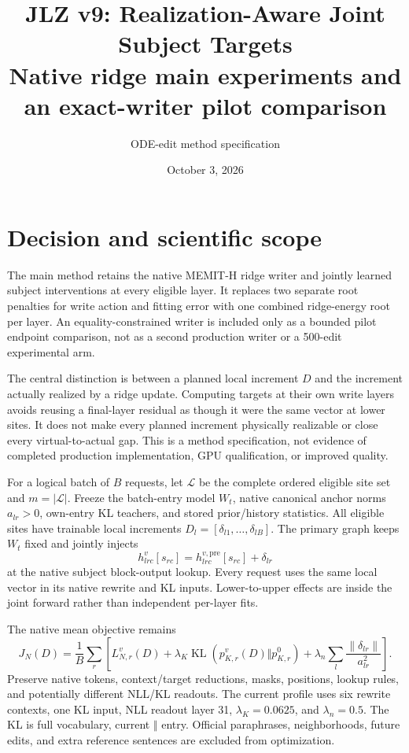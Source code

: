 \documentclass[10pt]{article}
\title{JLZ v9: Realization-Aware Joint Subject Targets\\
\large Native ridge main experiments and an exact-writer pilot comparison}
\author{ODE-edit method specification}
\date{October 3, 2026}
\newcommand{\KL}{\operatorname{KL}}
\newcommand{\norm}[1]{\left\lVert#1\right\rVert}
\begin{document}
\maketitle
\vspace{-1.5em}

\section{Decision and scientific scope}
The main method retains the native MEMIT-H ridge writer and jointly
learned subject interventions at every eligible layer. It replaces two
separate root penalties for write action and fitting error with one
combined ridge-energy root per layer. An equality-constrained writer is
included only as a bounded pilot endpoint comparison, not as a second
production writer or a 500-edit experimental arm.

The central distinction is between a planned local increment $D$ and
the increment actually realized by a ridge update. Computing targets at
their own write layers avoids reusing a final-layer residual as though
it were the same vector at lower sites. It does not make every planned
increment physically realizable or close every virtual-to-actual gap.
This is a method specification, not evidence of completed production
implementation, GPU qualification, or improved quality.

For a logical batch of $B$ requests, let $\mathcal L$ be the complete
ordered eligible site set and $m=|\mathcal L|$. Freeze the batch-entry
model $W_t$, native canonical anchor norms $a_{lr}>0$, own-entry KL
teachers, and stored prior/history statistics. All eligible sites have
trainable local increments $D_l=[\delta_{l1},\ldots,\delta_{lB}]$.
The primary graph keeps $W_t$ fixed and jointly injects
\[
 h^v_{lrc}[s_{rc}]=h^{v,\mathrm{pre}}_{lrc}[s_{rc}]+\delta_{lr}
\]
at the native subject block-output lookup. Every request uses the same
local vector in its native rewrite and KL inputs. Lower-to-upper effects
are inside the joint forward rather than independent per-layer fits.

The native mean objective remains
\[
 J_N(D)=\frac1B\sum_r\left[
 L^v_{N,r}(D)+\lambda_K\KL(p^v_{K,r}(D)\Vert p^0_{K,r})
 +\lambda_n\sum_l\frac{\norm{\delta_{lr}}}{a_{lr}^2}\right].
\]
Preserve native tokens, context/target reductions, masks, positions,
lookup rules, and potentially different NLL/KL readouts. The current
profile uses six rewrite contexts, one KL input, NLL readout layer 31,
$\lambda_K=0.0625$, and $\lambda_n=0.5$. The KL is full vocabulary,
current $\Vert$ entry. Official paraphrases, neighborhoods, future edits,
and extra reference sentences are excluded from optimization.
\end{document}
